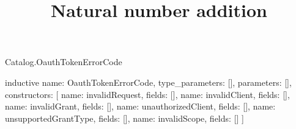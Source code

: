 \begin{lexlean}{Catalog.OauthTokenErrorCode}
\title{Natural number addition}
\begin{semanticmodule}
inductive{
  name: OauthTokenErrorCode,
  type_parameters: [],
  parameters: [],
  constructors: [
    {name: invalidRequest, fields: []},
    {name: invalidClient, fields: []},
    {name: invalidGrant, fields: []},
    {name: unauthorizedClient, fields: []},
    {name: unsupportedGrantType, fields: []},
    {name: invalidScope, fields: []}
  ]
}
\end{semanticmodule}
\end{lexlean}
